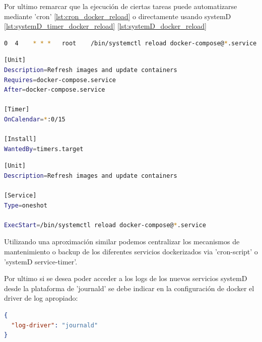 Por ultimo remarcar que la ejecución de ciertas tareas puede automatizarse mediante 'cron' \ref{lst:cron_docker_reload} o directamente usando systemD \ref{lst:systemD_timer_docker_reload} \ref{lst:systemD_docker_reload}

\begin{lstlisting}[language=bash, caption={Crone line /etc/crontab, actualizacion imagenes}, label={lst:cron_docker_reload} ]
0  4    * * *   root    /bin/systemctl reload docker-compose@*.service
\end{lstlisting}

\begin{lstlisting}[language=bash, caption={SystemD /etc/systemd/system/docker-compose-reload.timer}, label={lst:systemD_timer_docker_reload} ]
[Unit]
Description=Refresh images and update containers
Requires=docker-compose.service
After=docker-compose.service

[Timer]
OnCalendar=*:0/15

[Install]
WantedBy=timers.target
\end{lstlisting}

\begin{lstlisting}[language=bash, caption={SystemD /etc/systemd/system/docker-compose.reload.service }, label={lst:systemD_docker_reload} ]
[Unit]
Description=Refresh images and update containers

[Service]
Type=oneshot

ExecStart=/bin/systemctl reload docker-compose@*.service
\end{lstlisting}

Utilizando una aproximación similar podemos centralizar los mecanismos de mantenimiento o backup de los diferentes servicios dockerizados via 'cron-script' o 'systemD service-timer'.

Por ultimo si se desea poder acceder a los logs de los nuevos servicios systemD\cite{c_systemd} desde la plataforma de 'journald'\cite{c_journald} se debe indicar en la configuración de docker el driver de log apropiado:
\begin{lstlisting}[language=json, caption={Fichero de configuracion daemon.json}, label={lst:docker_log_journald} ]
{
  "log-driver": "journald"
}
\end{lstlisting}


